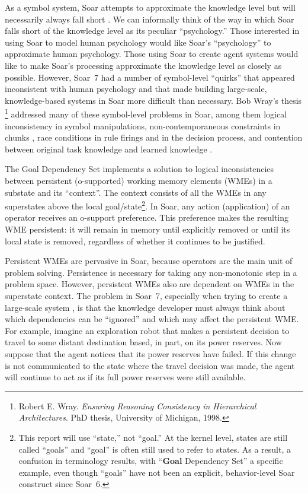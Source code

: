 As a symbol system, Soar attempts to approximate the knowledge level
but will necessarily always fall short \cite{Newell90:UTC}.  We can
informally think of the way in which Soar falls short of the knowledge
level as its peculiar ``psychology.''  Those interested in using Soar
to model human psychology would like Soar's ``psychology'' to
approximate human psychology.  Those using Soar to create agent
systems would like to make Soar's processing approximate the knowledge
level as closely as possible.  However, Soar~7 had a number of
symbol-level ``quirks'' that appeared inconsistent with human
psychology and that made building large-scale, knowledge-based systems
in Soar more difficult than necessary.  Bob Wray's thesis 
\footnote{Robert E. Wray. \textit{Ensuring Reasoning Consistency in Hierarchical Architectures}. PhD thesis, University of Michigan, 1998.}
addressed many of these symbol-level problems
in Soar, among them logical inconsistency in symbol manipulations,
non-contemporaneous constraints in chunks \cite{Wray96:Compilation},
race conditions in rule firings and in the decision process, and
contention between original task knowledge and learned knowledge
\cite{Wray01:Resolving}.

The Goal Dependency Set implements a solution to logical
inconsistencies between persistent (o-supported) working memory
elements (WMEs) in a substate and its ``context''.  The context
consists of all the WMEs in any superstates above the local
goal/state\footnote{This report will use ``state,'' not ``goal.''  At
the kernel level, states are still called ``goals'' and ``goal'' is often
still used to refer to states.    As a result, a
confusion in terminology results, with ``\textbf{Goal} Dependency Set'' a 
specific example, even though ``goals'' have not been
an explicit, behavior-level Soar construct since Soar~6.}.  In Soar, any
action (application) of an operator receives an o-support preference.
This preference makes the resulting WME persistent: it will remain in
memory until explicitly removed or until its local state is removed,
regardless of whether it continues to be justified.

Persistent WMEs are pervasive in Soar, because operators are the main
unit of problem solving.  Persistence is necessary for taking any
non-monotonic step in a problem space.  However, persistent WMEs also
are dependent on WMEs in the superstate context.  The problem in
Soar~7, especially when trying to create a large-scale system \cite{Jones99:Automated}, is that the knowledge developer
must always think about which dependencies can be ``ignored'' and
which may affect the persistent WME.  For
example, imagine an exploration robot that makes a persistent decision
to travel to some distant destination based, in part, on its power
reserves.  Now suppose that the agent notices that its power reserves
have failed.  If this change is not communicated to the state where
the travel decision was made, the agent will continue to act as if its
full power reserves were still available.

